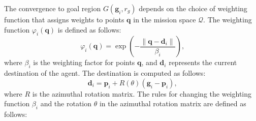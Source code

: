         The convergence to goal region $G(\mathbf{g}_i, r_g)$ depends on the choice of weighting function that assigns weights to points $\mathbf{q}$ in the mission space $\mathcal{Q}$.
        The weighting function $\varphi_i(\mathbf{q})$ is defined as follows: 
        \begin{equation}
            \label{eqn:weighting_func}
            \varphi_i(\mathbf{q}) = \exp\left(-\frac{\|\mathbf{q} - \mathbf{d}_i\|}{\beta_i}\right)\text{,}
        \end{equation}
        where $\beta_i$ is the weighting factor for points $\mathbf{q}$, and $\mathbf{d}_i$ represents the current destination of the agent. 
        The destination is computed as follows:
        \begin{equation}
            \label{eqn:destination}
            \mathbf{d}_i = \mathbf{p}_i + R(\theta)(\mathbf{g}_i - \mathbf{p}_i)\text{,}
        \end{equation}
        where $R$ is the azimuthal rotation matrix.
        The rules for changing the weighting function $\beta_i$ and the rotation $\theta$ in the azimuthal rotation matrix are defined as follows:
